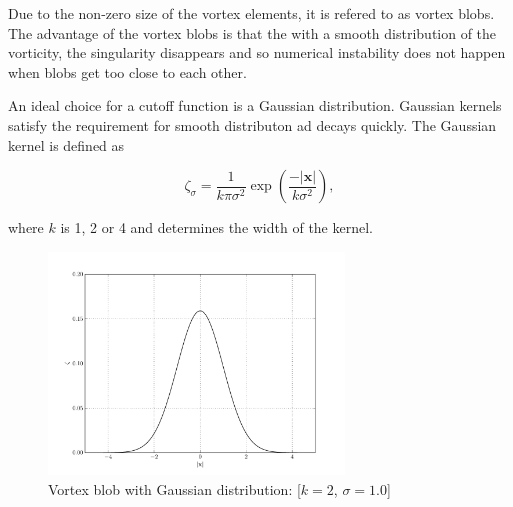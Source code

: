 Due to the non-zero size of the vortex elements, it is refered to as vortex blobs. The advantage of the vortex blobs is that the with a smooth distribution of the vorticity, the singularity disappears and so numerical instability does not happen when blobs get too close to each other. 

An ideal choice for a cutoff function is a Gaussian distribution. Gaussian kernels satisfy the requirement for smooth distributon ad decays quickly. The Gaussian kernel is defined as
	
	\begin{equation}
	\zeta_{\sigma} = \frac{1}{k\pi\sigma^2}\exp\left(\frac{-\left|\mathbf{x}\right|}{k\sigma^2}\right),
	\end{equation}

where $k$ is 1, 2 or 4 and determines the width of the kernel.

	\begin{figure}
	\centering
	\includegraphics[width=0.7\textwidth]{figures/lagrangian/gaussianKernel.pdf}
	\caption{Vortex blob with Gaussian distribution: [$k=2$, $\sigma=1.0$]}
	\end{figure}


%
%
%

